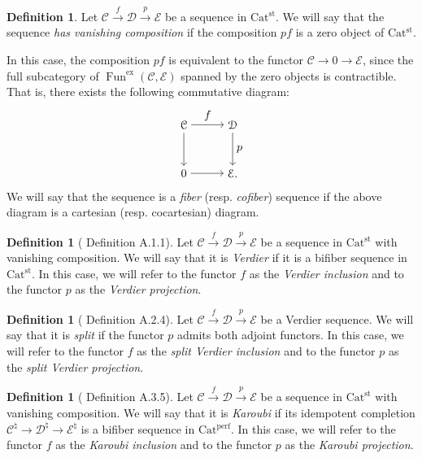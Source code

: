 \documentclass[a4paper,dvipdfmx,11pt,reqno]{amsart}
\DeclareMathOperator{\Fun}{Fun}
\newcommand{\C}{\mathcal{C}}
\newcommand{\D}{\mathcal{D}}
\newcommand{\E}{\mathcal{E}}
\newcommand{\Catperf}{\mathrm{Cat^{perf}}}
\newcommand{\Catst}{\mathrm{Cat^{st}}}
\theoremstyle{definition}
\newtheorem{definition}[theorem]{Definition}
\begin{document}
\begin{definition} \label{CDH23.rem.A.1.2}
  Let $\C \xrightarrow{f} \D \xrightarrow{p} \E$ be a sequence in $\Catst$.
  We will say that the sequence \textit{has vanishing composition} if the composition $pf$ is a zero object of $\Catst$.
  
  In this case, the composition $pf$ is equivalent to the functor $\C \to 0 \to \E$, since the full subcategory of $\Fun^{\mathrm{ex}}(\C,\E)$ spanned by the zero objects is contractible.
  That is, there exists the following commutative diagram:
  \[\begin{tikzpicture}[auto,->] 
    \node (tl) at (0,1.5) {$\C$}; 
    \node (tr) at (1.5,1.5) {$\D$};
    \node (bl) at (0,0) {$0$}; 
    \node (br) at (1.5,0) {$\E.$}; 
    \draw (tl) -- node {$f$} (tr); 
    \draw (bl) -- node[swap] {} (br); 
    \draw (tl) -- node[swap] {} (bl);
    \draw (tr) -- node {$p$} (br); 
  \end{tikzpicture}\]
  We will say that the sequence is a \textit{fiber} (resp. \textit{cofiber}) sequence if the above diagram is a cartesian (resp. cocartesian) diagram.
\end{definition}

\begin{definition}[\cite{CDH23} Definition A.1.1] \label{CDH23.def.A.1.1}
  Let $\C \xrightarrow{f} \D \xrightarrow{p} \E$ be a sequence in $\Catst$ with vanishing composition.
  We will say that it is \textit{Verdier} if it is a bifiber sequence in $\Catst$.
  In this case, we will refer to the functor $f$ as the \textit{Verdier inclusion} and to the functor $p$ as the \textit{Verdier projection}.
\end{definition}

\begin{definition}[\cite{CDH23} Definition A.2.4] \label{CDH23.def.A.2.4}
  Let $\C \xrightarrow{f} \D \xrightarrow{p} \E$ be a Verdier sequence.
  We will say that it is \textit{split} if the functor $p$ admits both adjoint functors.
  In this case, we will refer to the functor $f$ as the \textit{split Verdier inclusion} and to the functor $p$ as the \textit{split Verdier projection}.
\end{definition}

\begin{definition}[\cite{CDH23} Definition A.3.5] \label{CDH23.def.A.3.5}
  Let $\C \xrightarrow{f} \D \xrightarrow{p} \E$ be a sequence in $\Catst$ with vanishing composition.
  We will say that it is \textit{Karoubi} if its idempotent completion $\C^{\natural} \to \D^{\natural} \to \E^{\natural}$ is a bifiber sequence in $\Catperf$.
  In this case, we will refer to the functor $f$ as the \textit{Karoubi inclusion} and to the functor $p$ as the \textit{Karoubi projection}.
\end{definition}
\end{document}
